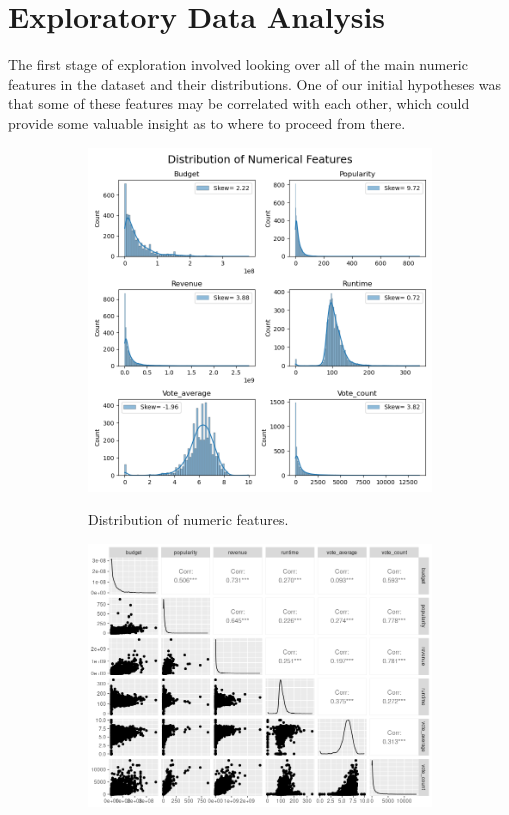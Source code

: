 \documentclass[12pt]{article}
\begin{document}
\section{Exploratory Data Analysis}
The first stage of exploration involved looking over all of the main numeric features in the dataset and their distributions. One of our initial hypotheses was that some of these features may be correlated with each other, which could provide some valuable insight as to where to proceed from there.
\begin{figure}[h!]
\centering

\begin{subfigure}[b]{0.45\textwidth}
\centering
\includegraphics[width=1\textwidth]{images/eda/numeric_distributions.png}
\label{fig:sub1}
\caption{Distribution of numeric features.}
\end{subfigure}
\hfill
\begin{subfigure}[b]{0.54\textwidth}
\centering
\includegraphics[width=1\textwidth]{images/eda/corr_plot.png}

\end{subfigure}
\end{figure}
\end{document}
